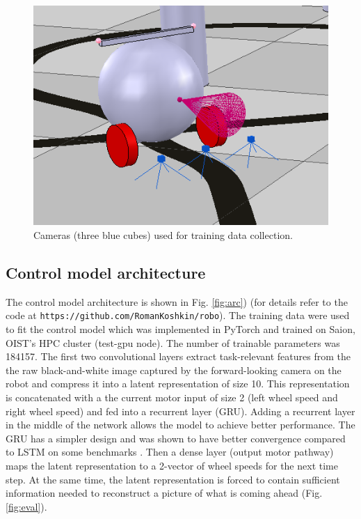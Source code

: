 \documentclass[11pt, oneside]{article}   	%
\begin{document}
\begin{figure}[h]
\includegraphics[width=\columnwidth]{Fig_2} 
\caption{Cameras (three blue cubes) used for training data collection.}
\label{fig:cams}
\end{figure}

\subsection{Control model architecture}

The control model architecture is shown in Fig. \ref{fig:arc}) (for details refer to the code at \texttt{https://github.com/RomanKoshkin/robo}). The training data were used to fit the control model which was implemented in PyTorch and trained on Saion, OIST's HPC cluster (test-gpu node). The number of trainable parameters was 184157. The first two convolutional layers extract task-rele\-vant features from the the raw black-and-white image captured by the forward-looking camera on the robot and compress it into a latent representation of size 10. This representation is concatenated with a the current motor input of size 2 (left wheel speed and right wheel speed) and fed into a recurrent layer (GRU). Adding a recurrent layer in the middle of the network allows the model to achieve better performance. The GRU has a simpler design and was shown to have better convergence compared to LS\-TM on some benchmarks \cite{Chung2015}. Then a dense layer (output motor pathway) maps the latent representation to a 2-vector of wheel speeds for the next time step. At the same time, the latent representation is forced to  contain sufficient information needed to reconstruct a picture of what is coming ahead (Fig. \ref{fig:eval}). 
\end{document}
